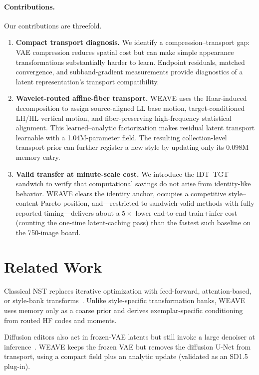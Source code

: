 \documentclass[letterpaper]{article} %
\begin{document}
\paragraph{Contributions.}
Our contributions are threefold.
\begin{enumerate}
\item \textbf{Compact transport diagnosis.} We identify a compression--transport gap: VAE
compression reduces spatial cost but can make simple appearance transformations
substantially harder to learn. Endpoint residuals, matched convergence, and subband-gradient
measurements provide diagnostics of a latent representation's transport compatibility.
\item \textbf{Wavelet-routed affine-fiber transport.} WEAVE uses the Haar-induced
decomposition to assign source-aligned LL base motion, target-conditioned LH/HL
vertical motion, and fiber-preserving high-frequency statistical alignment. This learned--analytic
factorization makes residual latent transport learnable with a 1.04M-parameter field. The resulting
collection-level transport prior can further register a new style by updating only its
0.098M memory entry.
\item \textbf{Valid transfer at minute-scale cost.} We introduce the IDT--TGT sandwich to
verify that computational savings do not arise from identity-like behavior. WEAVE clears
the identity anchor, occupies a competitive style--content Pareto position, and---restricted
to sandwich-valid methods with fully reported timing---delivers about a $5\times$ lower
end-to-end train+infer cost (counting the one-time latent-caching pass) than the fastest such baseline on the 750-image board.
\end{enumerate}

\section{Related Work}
\label{sec:related}

Classical NST replaces iterative optimization with feed-forward, attention-based, or style-bank transforms~\cite{gatys2015neural,gatys2016image,huang2017arbitrary,li2017universal,park2019sanet,deng2022stytr2,hong2023aespa,kwon2024aesfa,park2020cut,gim2024cast,zhang2024s2wat,zhang2025survey,chen2017stylebank}. Unlike style-specific transformation banks, WEAVE uses memory only as a coarse prior and derives exemplar-specific conditioning from routed HF codes and moments.

Diffusion editors also act in frozen-VAE latents but still invoke a large denoiser at inference~\cite{rombach2022high,hertz2022prompt,meng2021sdedit,chung2024style,hertz2024style,ye2023ipadapter,zhang2023inst,kim2022diffuseit,zhang2024artbank,lu2024zstar,wu2025qwenimagetechnicalreport,blackforestlabs2025flux2}. WEAVE keeps the frozen VAE but removes the diffusion U-Net from transport, using a compact field plus an analytic update (validated as an SD1.5 plug-in).
\end{document}
